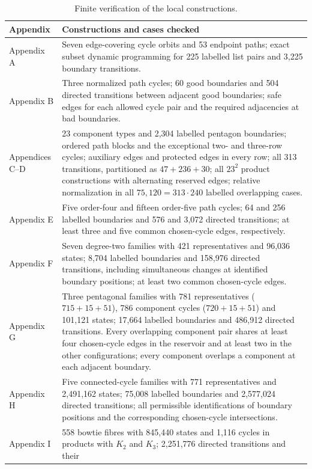 \documentclass[11pt]{article}
\theoremstyle{remark}
\numberwithin{equation}{section}
\numberwithin{table}{section}
\begin{document}
\begin{table}[htbp]
\centering\small
\caption{Finite verification of the local constructions.}
\label{tab:verification}
\begin{tabularx}{\linewidth}{@{}lX@{}}
\toprule
Appendix & Constructions and cases checked\\
\midrule
Appendix A & Seven edge-covering cycle orbits and 53 endpoint paths;
exact subset dynamic programming for 225 labelled list pairs and
3,225 boundary transitions.\\
Appendix B & Three normalized path cycles; 60 good boundaries and
504 directed transitions between adjacent good boundaries; safe edges
for each allowed cycle pair and the required adjacencies at bad boundaries.\\
Appendices C--D & 23 component types and 2,304 labelled pentagon
boundaries; ordered path blocks and the exceptional two- and three-row
cycles; auxiliary edges and protected edges in every row; all 313
transitions, partitioned as $47+236+30$; all $23^2$ product constructions
with alternating reserved edges; relative normalization in all
$75{,}120=313\mathbin\cdot240$ labelled overlapping cases.\\
Appendix E & Five order-four and fifteen order-five path cycles;
64 and 256 labelled boundaries and 576 and 3,072 directed transitions;
at least three and five common chosen-cycle edges, respectively.\\
Appendix F & Seven degree-two families with 421 representatives and
96,036 states; 8,704 labelled boundaries and 158,976 directed
transitions, including simultaneous changes at identified boundary
positions; at least two common chosen-cycle edges.\\
Appendix G & Three pentagonal families with 781 representatives
($715+15+51$), 786 component cycles ($720+15+51$) and 101,121 states;
17,664 labelled boundaries and 486,912 directed transitions. Every
overlapping component pair shares at least four chosen-cycle edges in
the reservoir and at least two in the other configurations; every
component overlaps a component at each adjacent boundary.\\
Appendix H & Five connected-cycle families with 771 representatives and
2,491,162 states; 75,008 labelled boundaries and 2,577,024 directed
transitions; all permissible identifications of boundary positions and
the corresponding chosen-cycle intersections.\\
Appendix I & 558 bowtie fibres with 845,440 states and 1,116 cycles in
products with $K_2$ and $K_3$; 2,251,776 directed transitions and their

\end{tabularx}
\end{table}
\end{document}
